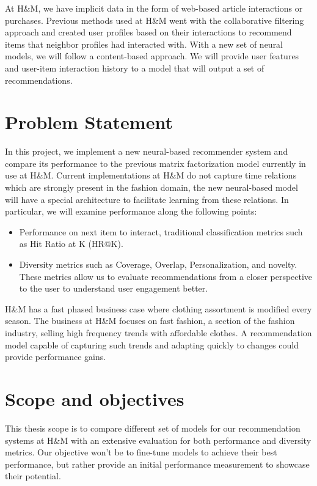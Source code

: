 \documentclass{kththesis}
\begin{document}
At H\&M, we have implicit data in the form of web-based article interactions or purchases. Previous methods used at H\&M went with the collaborative filtering approach and created user profiles based on their interactions to recommend items that neighbor profiles had interacted with. With a new set of neural models, we will follow a content-based approach. We will provide user features and user-item interaction history to a model that will output a set of recommendations.

\section{Problem Statement}

In this project, we implement a new neural-based recommender system and compare its performance to the previous matrix factorization model currently in use at H\&M.  Current implementations at H\&M do not capture time relations which are strongly present in the fashion domain, the new neural-based model will have a special architecture to facilitate learning from these relations. In particular, we will examine performance along the following points:

\begin{itemize}
    \item Performance on next item to interact, traditional classification metrics such as Hit Ratio at K (HR@K).
    \item Diversity metrics such as Coverage, Overlap, Personalization, and novelty. These metrics allow us to evaluate recommendations from a closer perspective to the user to understand user engagement better. 
\end{itemize}

H\&M has a fast phased business case where clothing assortment is modified every season. The business at H\&M focuses on fast fashion, a section of the fashion industry, selling high frequency trends with affordable clothes. A recommendation model capable of capturing such trends and adapting quickly to changes could provide performance gains.

\section{Scope and objectives}
This thesis scope is to compare different set of models for our recommendation systems at H\&M with an extensive evaluation for both performance and diversity metrics. Our objective won't be to fine-tune models to achieve their best performance, but rather provide an initial performance measurement to showcase their potential.
\end{document}
